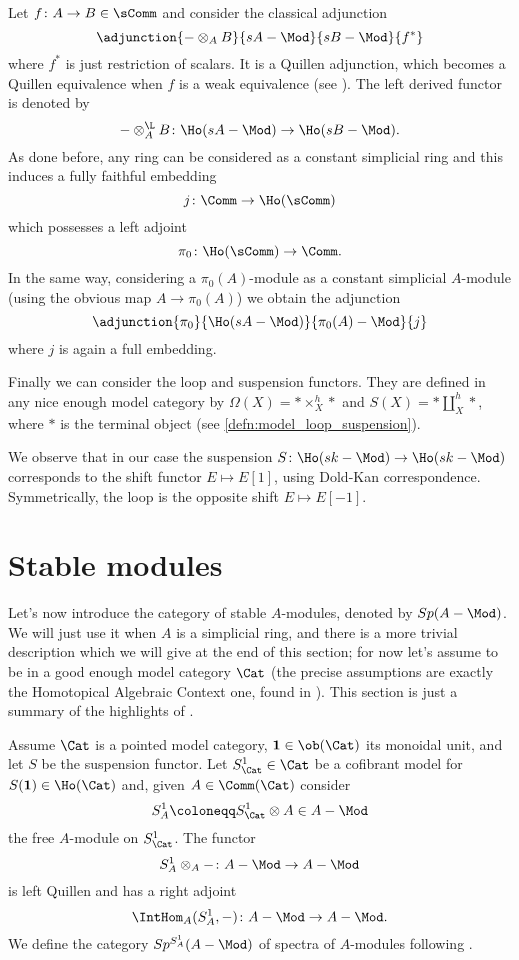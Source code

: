         Let $f\colon A \to B \in \sComm$ and consider the classical adjunction 
        \[
                \adjunction{- \otimes_A B}{sA-\Mod}{sB-\Mod}{f^*} 
        \] 
        where $f^*$ is just restriction of scalars. It is a Quillen adjunction, which becomes a Quillen equivalence when $f$ is a weak equivalence (see \cite[11.2.10]{Fr:module_operads}). The left derived functor is denoted by \[- \otimes_A^{\L} B\colon \Ho(sA-\Mod) \to \Ho(sB-\Mod). \] 
        As done before, any ring can be considered as a constant simplicial ring and this induces a fully faithful embedding \[j\colon \Comm \to \Ho(\sComm) \] which possesses a left adjoint \[\pi_0\colon \Ho(\sComm) \to \Comm. \] In the same way, considering a $\pi_0(A)$-module as a constant simplicial $A$-module (using the obvious map $A \to \pi_0(A)$) we obtain the adjunction \[\adjunction{\pi_0}{\Ho(sA-\Mod)}{\pi_0(A)-\Mod}{j} \] where $j$ is again a full embedding.

        Finally we can consider the loop and suspension functors. They are defined in any nice enough model category by $\Omega(X) = * \times_X^h *$ and $S(X) = * \coprod_X^h *$, where $*$ is the terminal object (see \cref{defn:model_loop_suspension}).

        We observe that in our case the suspension $S\colon \Ho(sk-\Mod) \to \Ho(sk-\Mod)$ corresponds to the shift functor $E \mapsto E[1]$, using Dold-Kan correspondence. Symmetrically, the loop is the opposite shift $E \mapsto E[-1]$.

    \section{Stable modules}
        Let's now introduce the category of stable $A$-modules, denoted by $Sp(A-\Mod)$. We will just use it when $A$ is a simplicial ring, and there is a more trivial description which we will give at the end of this section; for now let's assume to be in a good enough model category $\Cat$ (the precise assumptions are exactly the Homotopical Algebraic Context one, found in \cite{ToVe:hag2}). This section is just a summary of the highlights of \cite[1.2.11]{ToVe:hag2}.

        Assume $\Cat$ is a pointed model category, $\mathbf{1} \in \ob(\Cat)$ its monoidal unit, and let $S$ be the suspension functor. Let $S^1_{\Cat} \in \Cat$ be a cofibrant model for $S(\mathbf{1}) \in \Ho(\Cat)$ and, given $A \in \Comm(\Cat)$ consider \[S^1_A \coloneqq S^1_{\Cat} \otimes A \in A-\Mod \] the free $A$-module on $S^1_{\Cat}$.
        The functor \[S^1_A \otimes_A -\colon A-\Mod \to A-\Mod \] is left Quillen and has a right adjoint \[\IntHom_A(S^1_A, -)\colon A-\Mod \to A-\Mod. \] We define the category $Sp^{S^1_A}(A-\Mod)$ of spectra of $A$-modules following \cite{Hov:spectra}.

